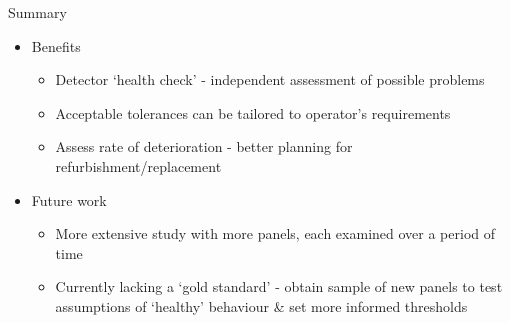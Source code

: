 \documentclass{beamer}
\begin{document}
\begin{frame}{Summary}

  \begin{itemize}
  \item
  	Benefits
  	\begin{itemize}
    \item
    		Detector `health check' - independent assessment of possible problems
    	\item
    		Acceptable tolerances can be tailored to operator's requirements
  	\item
    		Assess rate of deterioration - better planning for refurbishment/replacement
    	\end{itemize}
  \end{itemize}
  
  \begin{itemize}
  \item
    Future work
    \begin{itemize}
    \item
      More extensive study with more panels, each examined over a period of time 
    \item
    	  Currently lacking a `gold standard' - obtain sample of new panels to test assumptions of `healthy' behaviour \& set more informed thresholds
    \end{itemize}
  \end{itemize}
  
\end{frame}
\end{document}
